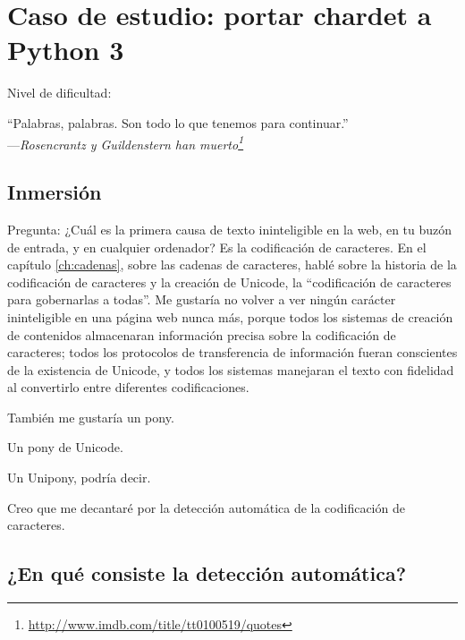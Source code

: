 
\chapter{Caso de estudio: portar chardet a Python 3}\label{ch:chardet}

\noindent Nivel de dificultad:\diflllll

\begin{citaCap}
    ``Palabras, palabras. Son todo lo que tenemos para continuar.'' \\
        ---\emph{Rosencrantz y Guildenstern han muerto\footnote{\href{http://www.imdb.com/title/tt0100519/quotes}{http://www.imdb.com/title/tt0100519/quotes}}}
\end{citaCap}

\section{Inmersión}

Pregunta: ¿Cuál es la primera causa de texto ininteligible en la web, en tu buzón de entrada, y en cualquier ordenador? Es la codificación de caracteres. En el capítulo \ref{ch:cadenas}, sobre las cadenas de caracteres, hablé sobre la historia de la codificación de caracteres y la creación de Unicode, la “codificación de caracteres para gobernarlas a todas”. Me gustaría no volver a ver ningún carácter ininteligible en una página web nunca más, porque todos los sistemas de creación de contenidos almacenaran información precisa sobre la codificación de caracteres; todos los protocolos de transferencia de información fueran conscientes de la existencia de Unicode, y todos los sistemas manejaran el texto con fidelidad al convertirlo entre diferentes codificaciones.

También me gustaría un pony.

Un pony de Unicode.

Un Unipony, podría decir.

Creo que me decantaré por la detección automática de la codificación de caracteres.

\section{¿En qué consiste la detección automática?}

